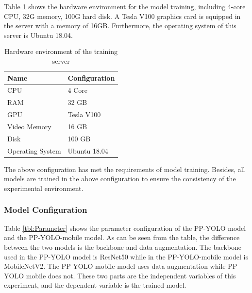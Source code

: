\documentclass[sensors,article,submit,moreauthors,pdftex]{Definitions/mdpi}
\begin{document}
\begin{paracol}{2}
Table \ref{tbl:Hardware} shows the hardware environment for the model training, including 4-core CPU, 32G memory, 100G hard disk. A Tesla V100 graphics card is equipped in the server with a memory of 16GB. Furthermore, the operating system of this server is Ubuntu 18.04.

\begin{table}[htbp]
\centering
\caption{Hardware environment of the training server}
\begin{tabular}{ll} 
\toprule
\textbf{Name}&\textbf{Configuration}\\
\midrule
CPU& 4 Core \\
RAM& 32 GB \\
GPU& Tesla V100 \\
Video Memory& 16 GB\\
Disk& 100 GB\\
Operating System& Ubuntu 18.04\\
\bottomrule
\end{tabular}
\label{tbl:Hardware}
\end{table}

The above configuration has met the requirements of model training. Besides, all models are trained in the above configuration to ensure the consistency of the experimental environment.

\subsubsection{Model Configuration}

Table \ref{tbl:Parameter} shows the parameter configuration of the PP-YOLO model and the PP-YOLO-mobile model. As can be seen from the table, the difference between the two models is the backbone and data augmentation. The backbone used in the PP-YOLO model is ResNet50 while in the PP-YOLO-mobile model is MobileNetV2. The PP-YOLO-mobile model uses data augmentation while PP-YOLO mobile does not. These two parts are the independent variables of this experiment, and the dependent variable is the trained model.

\end{paracol}
\end{document}
